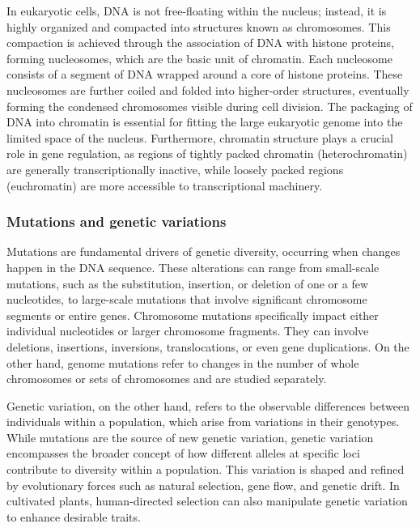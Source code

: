 In eukaryotic cells, DNA is not free-floating within the nucleus; instead, it is highly organized and compacted into structures known as chromosomes. This compaction is achieved through the association of DNA with histone proteins, forming nucleosomes, which are the basic unit of chromatin. Each nucleosome consists of a segment of DNA wrapped around a core of histone proteins. These nucleosomes are further coiled and folded into higher-order structures, eventually forming the condensed chromosomes visible during cell division. The packaging of DNA into chromatin is essential for fitting the large eukaryotic genome into the limited space of the nucleus. Furthermore, chromatin structure plays a crucial role in gene regulation, as regions of tightly packed chromatin (heterochromatin) are generally transcriptionally inactive, while loosely packed regions (euchromatin) are more accessible to transcriptional machinery. %

\subsubsection{\textbf{Mutations and genetic variations}}

Mutations are fundamental drivers of genetic diversity, occurring when changes happen in the DNA sequence. These alterations can range from small-scale mutations, such as the substitution, insertion, or deletion of one or a few nucleotides, to large-scale mutations that involve significant chromosome segments or entire genes. Chromosome mutations specifically impact either individual nucleotides or larger chromosome fragments. They can involve deletions, insertions, inversions, translocations, or even gene duplications. On the other hand, genome mutations refer to changes in the number of whole chromosomes or sets of chromosomes and are studied separately. %

Genetic variation, on the other hand, refers to the observable differences between individuals within a population, which arise from variations in their genotypes. While mutations are the source of new genetic variation, genetic variation encompasses the broader concept of how different alleles at specific loci contribute to diversity within a population. This variation is shaped and refined by evolutionary forces such as natural selection, gene flow, and genetic drift. In cultivated plants, human-directed selection can also manipulate genetic variation to enhance desirable traits. %
